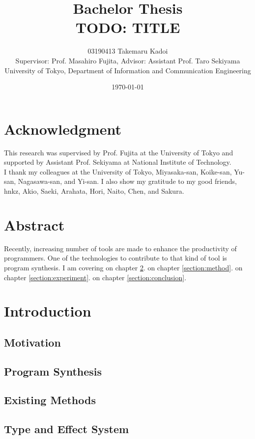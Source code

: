 \documentclass[12pt, a4paper, titlepage]{report}
\title{Bachelor Thesis \\ TODO: TITLE}
\author{
  03190413 Takemaru Kadoi
  \\[1cm]
  {\small Supervisor: Prof. Masahiro Fujita},
  {\small Advisor: Assistant Prof. Taro Sekiyama}
  \\[1cm]
  {\small University of Tokyo, Department of Information and Communication Engineering}
}
\date{\today}
\begin{document}
\maketitle
\newpage
\tableofcontents
\newpage

\chapter*{Acknowledgment}
This research was supervised by Prof. Fujita at the University of Tokyo and supported by Assistant Prof. Sekiyama at National Institute of Technology. \\
I thank my colleagues at the University of Tokyo, Miyasaka-san, Koike-san, Yu-san, Nagasawa-san, and Yi-san.
I also show my gratitude to my good friends, hnkz, Akio, Saeki, Arahata, Hori, Naito, Chen, and Sakura.

\chapter{Abstract} %
\label{section:abstract}
Recently, increasing number of tools are made to enhance the productivity of programmers. One of the technologies to contribute to that kind of tool is program synthesis.
I am covering on chapter \ref{section:introduction}.
on chapter \ref{section:method}.
on chapter \ref{section:experiment}.
on chapter \ref{section:conclusion}.

\chapter{Introduction}
\label{section:introduction}
  \section{Motivation}
  \section{Program Synthesis}
    \cite{gulwani2017program}
  \section{Existing Methods}
  \section{Type and Effect System}
\end{document}
